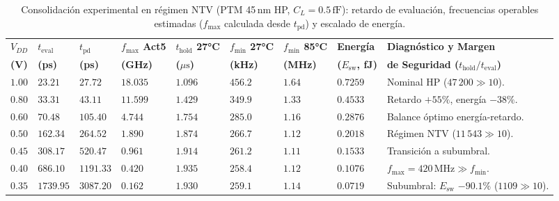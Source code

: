 \begin{table}[htbp]
\centering
\fontsize{7.5pt}{8.8pt}\selectfont
\caption[Consolidación de métricas de conmutación, retención y energía en NTV]{Consolidación experimental en régimen NTV (PTM 45\,nm HP, $C_L=0.5\,\text{fF}$): retardo de evaluación, frecuencias operables estimadas ($f_{\max}$ calculada desde $t_{\text{pd}}$) y escalado de energía.}
\label{tab:ntv_resumen}
\begin{tabularx}{\linewidth}{@{}>{\centering\arraybackslash}p{1.0cm} >{\centering\arraybackslash}p{1.2cm} >{\centering\arraybackslash}p{1.2cm} >{\centering\arraybackslash}p{1.3cm} >{\centering\arraybackslash}p{1.4cm} >{\centering\arraybackslash}p{1.4cm} >{\centering\arraybackslash}p{1.3cm} >{\centering\arraybackslash}p{1.3cm} >{\RaggedRight\arraybackslash}X@{}}
\toprule
\textbf{$V_{DD}$} & \textbf{$t_{\text{eval}}$} & \textbf{$t_{\text{pd}}$} & \textbf{$f_{\max}$ Act5} & \textbf{$t_{\text{hold}}$ 27°C} & \textbf{$f_{\min}$ 27°C} & \textbf{$f_{\min}$ 85°C} & \textbf{Energía} & \textbf{Diagnóstico y Margen} \\
\textbf{(V)} & \textbf{(ps)} & \textbf{(ps)} & \textbf{(GHz)} & \textbf{($\mu\text{s}$)} & \textbf{(kHz)} & \textbf{(MHz)} & \textbf{($E_{\text{sw}}$, fJ)} & \textbf{de Seguridad ($t_{\text{hold}}/t_{\text{eval}}$)} \\
\midrule
$1.00$ & $23.21$  & $27.72$   & $\mathbf{18.035}$ & $1.096$ & $456.2$ & $1.64$ & $0.7259$ & Nominal HP ($47\,200 \gg 10$). \\
$0.80$ & $33.31$  & $43.11$   & $\mathbf{11.599}$ & $1.429$ & $349.9$ & $1.33$ & $0.4533$ & Retardo $+55\%$, energía $-38\%$. \\
$0.60$ & $70.48$  & $105.40$  & $\mathbf{4.744}$  & $1.754$ & $285.0$ & $1.16$ & $0.2876$ & Balance óptimo energía-retardo. \\
$0.50$ & $162.34$ & $264.52$  & $\mathbf{1.890}$  & $1.874$ & $266.7$ & $1.12$ & $0.2018$ & Régimen NTV ($11\,543 \gg 10$). \\
$0.45$ & $308.17$ & $520.47$  & $\mathbf{0.961}$  & $1.914$ & $261.2$ & $1.11$ & $0.1533$ & Transición a subumbral. \\
$0.40$ & $686.10$ & $1191.33$ & $\mathbf{0.420}$  & $1.935$ & $258.4$ & $1.12$ & $0.1076$ & $f_{\max} = 420\,\text{MHz} \gg f_{\min}$. \\
$0.35$ & $1739.95$& $3087.20$ & $\mathbf{0.162}$  & $1.930$ & $259.1$ & $1.14$ & $0.0719$ & Subumbral: $E_{\text{sw}}$ $-90.1\%$ ($1109 \gg 10$). \\
\bottomrule
\end{tabularx}
\end{table}

